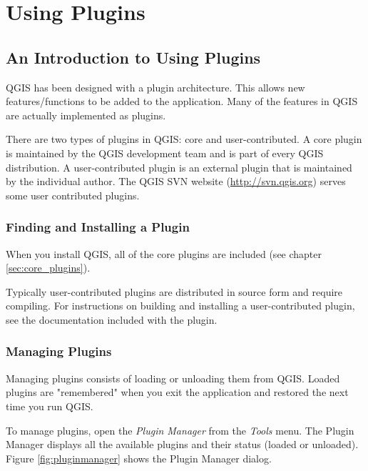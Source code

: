 \section{Using Plugins}

\subsection{An Introduction to Using Plugins}\label{label_introplugin}

QGIS has been designed with a plugin architecture. This allows new
features/functions to be added to the application. Many of the features in
QGIS are actually implemented as plugins.

There are two types of plugins in QGIS: core and user-contributed.
 A core plugin is maintained by the QGIS development team
and is part of every QGIS distribution. A user-contributed plugin is an
external plugin that is maintained by the individual author. The QGIS
SVN website (\url{http://svn.qgis.org}) serves some user contributed 
plugins.

\subsubsection{Finding and Installing a Plugin}
When you install QGIS, all of the core plugins are included (see chapter \ref{sec:core_plugins}). 

Typically user-contributed plugins are distributed in source form and require
compiling. For instructions on building and installing a user-contributed
plugin, see the documentation included with the plugin.

\subsubsection{Managing Plugins}\label{sec:managing_plugins}
 Managing plugins consists of loading or unloading them from
QGIS. Loaded plugins are "remembered" when you exit the application and
restored the next time you run QGIS.

To manage plugins, open the \textsl{Plugin Manager} from the \textsl{Tools}
menu. The Plugin Manager displays all the available
plugins and their status (loaded or unloaded). Figure \ref{fig:pluginmanager}
shows the Plugin Manager dialog.

